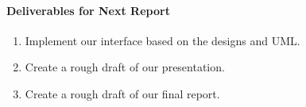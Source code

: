 \documentclass[12pt,oneside]{article}
\begin{document}
\paragraph{Deliverables for Next Report}
\begin{enumerate}
    \item Implement our interface based on the designs and UML.
    \item Create a rough draft of our presentation.
    \item Create a rough draft of our final report.
\end{enumerate}

\singlespace

%
\end{document}
